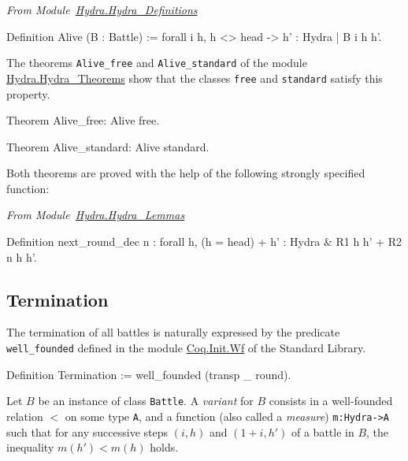\vspace{4pt}
\emph{From Module~\href{../theories/html/hydras.Hydra.Hydra_Definitions.html\#Alive}{Hydra.Hydra\_Definitions}}

\begin{Coqsrc}
Definition Alive (B : Battle) :=
  forall i h, 
     h <> head -> {h' : Hydra |  B i h h'}.
\end{Coqsrc}

The theorems \texttt{Alive\_free} and \texttt{Alive\_standard} of the module 
\href{../theories/html/hydras.Hydra.Hydra_Theorems.html}{Hydra.Hydra\_Theorems} show that the classes \texttt{free} and \texttt{standard} satisfy this property.

\begin{Coqsrc}
Theorem Alive_free: Alive free.

Theorem Alive_standard: Alive standard.  
\end{Coqsrc}

Both theorems are proved with the help of the  following strongly specified function:

\vspace{4pt}
\emph{From Module~\href{../theories/html/hydras.Hydra.Hydra_Lemmas.html\#next_round_dec}{Hydra.Hydra\_Lemmas}}

\begin{Coqsrc}
Definition  next_round_dec n :
 forall h, (h = head) + {h' : Hydra & {R1 h h'} + {R2 n h  h'}}.
\end{Coqsrc}


\subsection{Termination}

The termination of all battles is naturally expressed by the predicate \texttt{well\_founded} defined in the module \href{https://coq.inria.fr/distrib/current/stdlib/Coq.Init.Wf.html}{Coq.Init.Wf} 
 of the Standard Library.


\begin{Coqsrc}
Definition Termination :=  well_founded (transp _ round).
\end{Coqsrc}


Let $B$ be an instance of class \texttt{Battle}. A \emph{variant} for $B$ consists
in a well-founded relation $<$  on some type \texttt{A}, and a function
(also called a \emph{measure}) \texttt{m:Hydra->A} such that for any successive steps $(i,h)$ and $(1+i,h')$  of a battle in $B$, the inequality $m(h')<m(h)$ holds.


